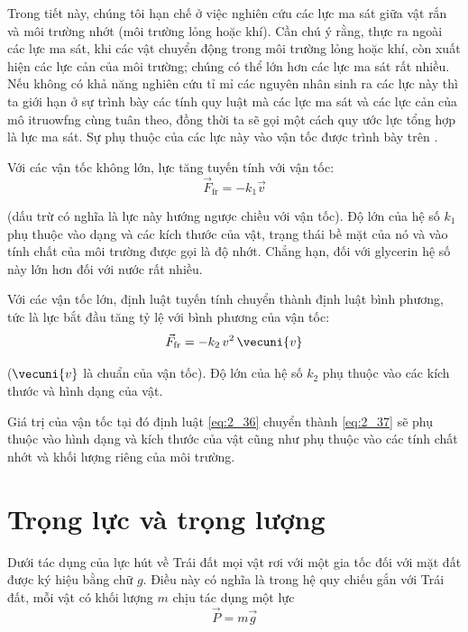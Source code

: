 Trong tiết này, chúng tôi hạn chế ở việc nghiên cứu các lực ma sát giữa vật rắn và môi trường nhớt (môi trường lỏng hoặc khí). Cần chú ý rằng, thực ra ngoài các lực ma sát, khi các vật chuyển động trong môi trường lỏng hoặc khí, còn xuất hiện các lực cản của môi trường; chúng có thể lớn hơn các lực ma sát rất nhiều. Nếu không có khả năng nghiên cứu tỉ mỉ các nguyên nhân sinh ra các lực này thì ta giới hạn ở sự trình bày các tính quy luật mà các lực ma sát và các lực cản của mô itruowfng cùng tuân theo, đồng thời ta sẽ gọi một cách quy ước lực tổng hợp là lực ma sát. Sự phụ thuộc của các lực này vào vận tốc được trình bày trên .

Với các vận tốc không lớn, lực tăng tuyến tính với vận tốc:
\begin{equation}\label{eq:2_36}
\vec{F}_{\text{fr}} = -k_1 \vec{v}
\end{equation}

\noindent
(dấu trừ có nghĩa là lực này hướng ngược chiều với vận tốc). Độ lớn của hệ số $k_1$ phụ thuộc vào dạng và các kích thước của vật, trạng thái bề mặt của nó và vào tính chất của môi trường được gọi là độ nhớt. Chẳng hạn, đối với glycerin hệ số này lớn hơn đối với nước rất nhiều.

Với các vận tốc lớn, định luật tuyến tính chuyển thành định luật bình phương, tức là lực bắt đầu tăng tỷ lệ với bình phương của vận tốc:
\begin{equation}\label{eq:2_37}
\vec{F}_{\text{fr}} = -k_2\, v^2\, \vecuni{v}
\end{equation}

\noindent
($\vecuni{v}$ là chuẩn của vận tốc). Độ lớn của hệ số $k_2$ phụ thuộc vào các kích thước và hình dạng của vật.

Giá trị của vận tốc tại đó định luật \eqref{eq:2_36} chuyển thành \eqref{eq:2_37} sẽ phụ thuộc vào hình dạng và kích thước của vật cũng như phụ thuộc vào các tính chất nhớt và khối lượng riêng của môi trường.

\section{Trọng lực và trọng lượng}\label{sec:2_11}

Dưới tác dụng của lực hút về Trái đất mọi vật rơi với một gia tốc đối với mặt đất được ký hiệu bằng chữ $g$. Điều này có nghĩa là trong hệ quy chiếu gắn với Trái đất, mỗi vật có khối lượng $m$ chịu tác dụng một lực
\begin{equation}\label{eq:2_38}
\vec{P} = m\vec{g}
\end{equation}

